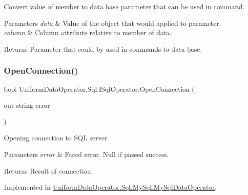 Convert value of member to data base parameter that can be used in command. 


\begin{DoxyParams}{Parameters}
{\em data} & Value of the object that would applied to parameter.\\
\hline
{\em column} & Column attribute relative to member of data.\\
\hline
\end{DoxyParams}
\begin{DoxyReturn}{Returns}
Parameter that could by used in commands to data base.
\end{DoxyReturn}
\mbox{\label{interface_uniform_data_operator_1_1_sql_1_1_i_sql_operator_a6fc9e5efd1e21ae9998b9c56ae9e347c}} 
\subsubsection{\texorpdfstring{Open\+Connection()}{OpenConnection()}}
{\footnotesize\ttfamily bool Uniform\+Data\+Operator.\+Sql.\+I\+Sql\+Operator.\+Open\+Connection (\begin{DoxyParamCaption}\item[{out string}]{error }\end{DoxyParamCaption})}



Opening connection to S\+QL server. 


\begin{DoxyParams}{Parameters}
{\em error} & Faced error. Null if passed success.\\
\hline
\end{DoxyParams}
\begin{DoxyReturn}{Returns}
Result of connection.
\end{DoxyReturn}


Implemented in \mbox{\hyperlink{class_uniform_data_operator_1_1_sql_1_1_my_sql_1_1_my_sql_data_operator_ae7ad4f4d29d927fa8551b087a6e596b5}{Uniform\+Data\+Operator.\+Sql.\+My\+Sql.\+My\+Sql\+Data\+Operator}}.

\mbox{\label{interface_uniform_data_operator_1_1_sql_1_1_i_sql_operator_acf6fdbfc57a21efc371e0772244defd5}} 
